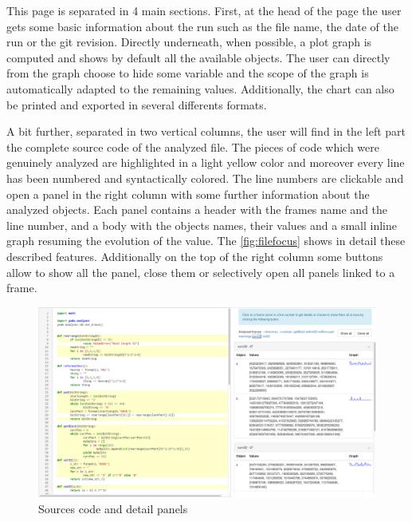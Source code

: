 This page is separated in 4 main sections. First, at the head of the page the user gets some basic information about the run such as the file name, the date of the run or the git revision. Directly underneath, when possible, a plot graph is computed and shows by default all the available objects. The user can directly from the graph choose to hide some variable and the scope of the graph is automatically adapted to the remaining values. Additionally, the chart can also be printed and exported in several differents formats.

A bit further, separated in two vertical columns, the user will find in the left part the complete source code of the analyzed file. The pieces of code which were genuinely analyzed are highlighted in a light yellow color and moreover every line has been numbered and syntactically colored. The line numbers are clickable and open a panel in the right column with some further information about the analyzed objects. Each panel contains a header with the frames name and the line number, and a body with the objects names, their values and a small inline graph resuming the evolution of the value. The \autoref{fig:filefocus} shows in detail these described features. Additionally on the top of the right column some buttons allow to show all the panel, close them or selectively open all panels linked to a frame.

\begin{figure}[h!]
  \centering
    \includegraphics[width=\textwidth]{figures/yoda-file-focus.png}
    \caption{Sources code and detail panels}
    \label{fig:filefocus}
\end{figure}

